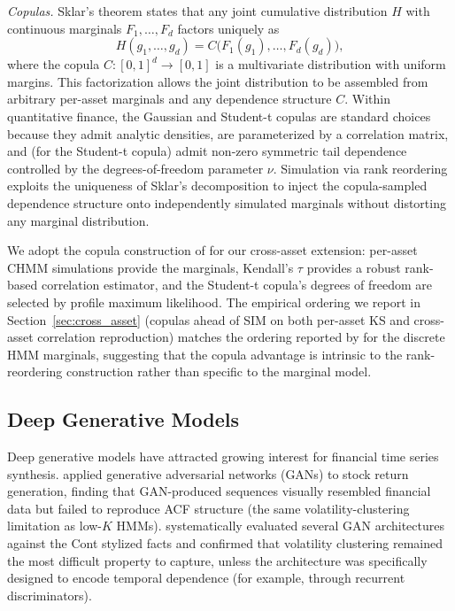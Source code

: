 \textit{Copulas.}
Sklar's theorem \cite{sklar1959fonctions, nelsen2006introduction} states that any joint cumulative distribution $H$ with continuous marginals $F_1, \dots, F_d$ factors uniquely as
\begin{equation}
    H(g_1, \dots, g_d) = C\bigl(F_1(g_1), \dots, F_d(g_d)\bigr),
\end{equation}
where the copula $C : [0,1]^d \to [0,1]$ is a multivariate distribution with uniform margins.
This factorization allows the joint distribution to be assembled from arbitrary per-asset marginals and any dependence structure $C$.
Within quantitative finance, the Gaussian and Student-t copulas \cite{demarta2005tcopula, mcneil2015quantitative} are standard choices because they admit analytic densities, are parameterized by a correlation matrix, and (for the Student-t copula) admit non-zero symmetric tail dependence controlled by the degrees-of-freedom parameter $\nu$.
Simulation via rank reordering \cite{iman1982distribution} exploits the uniqueness of Sklar's decomposition to inject the copula-sampled dependence structure onto independently simulated marginals without distorting any marginal distribution.

We adopt the copula construction of \cite{mcneil2015quantitative} for our cross-asset extension: per-asset CHMM simulations provide the marginals, Kendall's $\tau$ provides a robust rank-based correlation estimator, and the Student-t copula's degrees of freedom are selected by profile maximum likelihood.
The empirical ordering we report in Section~\ref{sec:cross_asset} (copulas ahead of SIM on both per-asset KS and cross-asset correlation reproduction) matches the ordering reported by \citet{alswaidan2026hybrid} for the discrete HMM marginals, suggesting that the copula advantage is intrinsic to the rank-reordering construction rather than specific to the marginal model.

\subsection{Deep Generative Models}

Deep generative models have attracted growing interest for financial time series synthesis.
\citet{takahashi2019modeling} applied generative adversarial networks (GANs) to stock return generation, finding that GAN-produced sequences visually resembled financial data but failed to reproduce ACF structure (the same volatility-clustering limitation as low-$K$ HMMs).
\citet{kwon2024can} systematically evaluated several GAN architectures against the Cont stylized facts and confirmed that volatility clustering remained the most difficult property to capture, unless the architecture was specifically designed to encode temporal dependence (for example, through recurrent discriminators).

